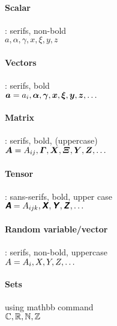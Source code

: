 \documentclass{article}
\begin{document}
	\paragraph{Scalar}: serifs, non-bold \\
	$a, \alpha, \gamma, x, \xi, y, z $
	\paragraph{Vectors}: serifs, bold \\
	$\bm{a} = a_i, \bm{\alpha}, \bm{\gamma},  \bm{x}, \bm{\xi}, \bm{y}, \bm{z}, \dots$
	
	\paragraph{Matrix}: serifs, bold, (uppercase) \\
	$\bm{A} = A_{ij} , \bm{\varGamma},  \bm{X}, \bm{\varXi}, \bm{Y}, \bm{Z}, \dots$
		
	\paragraph{Tensor}: sans-serifs, bold, upper case \\
	$\textsf{\textbf{\textsl{A}}} = A_{ijk}, \textsf{\textbf{\textsl{X}}}, \textsf{\textbf{\textsl{Y}}}, \textsf{\textbf{\textsl{Z}}}, \dots $	
	
	\paragraph{Random variable/vector}: serifs, non-bold, uppercase \\
	$A = A_{i}, X, Y, Z, \dots $			
	
	\paragraph{Sets} using mathbb command\\
	$ \mathbb{C}, \mathbb{R}, \mathbb{N}, \mathbb{Z} $	
	
\end{document}
